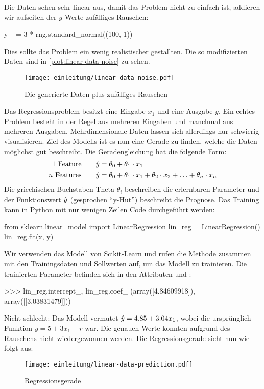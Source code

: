 \noindent
Die Daten sehen sehr linear aus, damit das Problem nicht zu einfach ist,
addieren wir aufseiten der $y$ Werte zufälliges Rauschen:
\begin{pythoncode}
y += 3 * rng.standard_normal((100, 1))
\end{pythoncode}
Dies sollte das Problem ein wenig realistischer gestallten.
Die so modifizierten Daten sind in \autoref{plot:linear-data-noise} zu sehen.
\newpage
\begin{figure}[h!]
  \centering
  \texttt{[image: einleitung/linear-data-noise.pdf]}
  \caption{Die generierte Daten plus zufälliges Rauschen}
  \label{plot:linear-data-noise}
\end{figure}
\noindent
Das Regressionsproblem besitzt eine Eingabe $x_1$ und eine Ausgabe $y$.
Ein echtes Problem besteht in der Regel aus mehreren Eingaben und manchmal
aus mehreren Ausgaben. Mehrdimensionale Daten lassen sich allerdings nur schwierig
visualisieren. Ziel des Modells ist es nun eine Gerade zu finden, welche die
Daten möglichst gut beschreibt. Die Geradengleichung hat die folgende Form:
\begin{align}
  \text{1 Feature}\qquad    & \hat{y} = \theta_0 + \theta_1 \cdot x_1   \\
  \text{$n$ Features}\qquad & \hat{y} = \theta_0 + \theta_1 \cdot x_1 +
  \theta_2 \cdot x_2 + \ldots + \theta_n \cdot x_n
\end{align}
Die griechischen Buchstaben Theta $\theta_i$ beschreiben die erlernbaren Parameter und
der Funktionswert $\hat{y}$ (gesprochen \enquote{y-Hut}) beschreibt die Prognose.
Das Training kann in Python mit nur wenigen Zeilen Code durchgeführt werden:
\begin{pythoncode}
from sklearn.linear_model import LinearRegression
lin_reg = LinearRegression()
lin_reg.fit(x, y)
\end{pythoncode}
Wir verwenden das  Modell von Scikit-Learn
und rufen die Methode  zusammen
mit den Trainingsdaten und Sollwerten auf, um das Modell zu trainieren.
Die trainierten Parameter befinden sich in den Attributen 
und :
\begin{pyconcode}
>>> lin_reg.intercept_, lin_reg.coef_
(array([4.84609918]), array([[3.03831479]]))
\end{pyconcode}
Nicht schlecht: Das Modell vermutet $\hat{y} = 4.85 + 3.04x_1$, wobei die ursprünglich
Funktion $y = 5 + 3x_1 + r$ war. Die genauen Werte konnten aufgrund des Rauschens
nicht wiedergewonnen werden. Die Regressionsgerade sieht nun wie folgt aus:
\begin{figure}[h!]
  \centering
  \texttt{[image: einleitung/linear-data-prediction.pdf]}
  \caption{Regressionsgerade}
  \label{plot:linear-data-prediction}
\end{figure}

